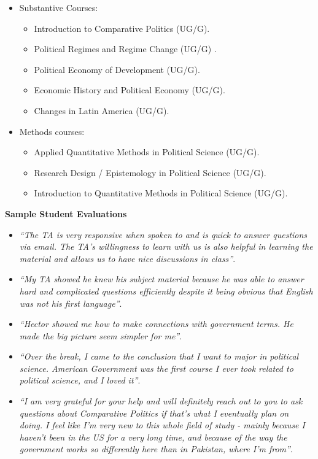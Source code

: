 \documentclass[11pt]{letter} %
\begin{document}
\begin{letter}{}
\begin{itemize}
\item Substantive Courses:
	\begin{itemize}
	\item Introduction to Comparative Politics (UG/G).
	\item Political Regimes and Regime Change (UG/G) .
	\item Political Economy of Development (UG/G).
	\item Economic History and Political Economy (UG/G).
	\item Changes in Latin America (UG/G).
	\end{itemize}
\item Methods courses:
	\begin{itemize}
	\item Applied Quantitative Methods in Political Science (UG/G).
	\item Research Design / Epistemology in Political Science (UG/G).
	\item Introduction to Quantitative Methods in Political Science (UG/G).
	\end{itemize}
\end{itemize}


{\bf Sample Student Evaluations}

\begin{itemize}

\item \emph{``The TA is very responsive when spoken to and is quick to answer questions via email. The TA's willingness to learn with us is also helpful in learning the material and allows us to have nice discussions in class''}.

\item \emph{``My TA showed he knew his subject material because he was able to answer hard and complicated questions efficiently despite it being obvious that English was not his first language''}.

\item \emph{``Hector showed me how to make connections with government terms. He made the big picture seem simpler for me''}.

\item \emph{``Over the break, I came to the conclusion that I want to major in political science. American Government was the first course I ever took related to political science, and I loved it''}.

\item \emph{``I am very grateful for your help and will definitely reach out to you to ask questions about Comparative Politics if that's what I eventually plan on doing. I feel like I'm very new to this whole field of study - mainly because I haven't been in the US for a very long time, and because of the way the government works so differently here than in Pakistan, where I'm from''}.


\end{itemize}
\end{letter}
\end{document}
